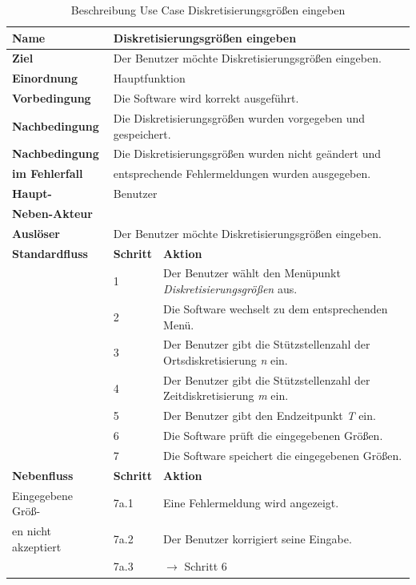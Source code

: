 \begin{table} [H]
	\centering
	\begin{tabular}{|l|l|l|}
		\hline
		\textbf{Name} 			& \multicolumn{2}{|l|}{Diskretisierungsgrößen eingeben}  \\
		\hline
		\textbf{Ziel} 			& \multicolumn{2}{|l|}{Der Benutzer möchte Diskretisierungsgrößen eingeben. }\\ 
		\hline
		\textbf{Einordnung}		& \multicolumn{2}{|l|}{Hauptfunktion}\\
		\hline
		\textbf{Vorbedingung}	& \multicolumn{2}{|l|}{Die Software wird korrekt ausgeführt.} \\
		\hline
		\textbf{Nachbedingung}	& \multicolumn{2}{|l|}{Die Diskretisierungsgrößen wurden vorgegeben und gespeichert.}\\
		\hline
		\textbf{Nachbedingung} 	& \multicolumn{2}{|l|}{Die Diskretisierungsgrößen wurden nicht geändert und}\\
		\textbf{im Fehlerfall}	& \multicolumn{2}{|l|}{entsprechende Fehlermeldungen wurden ausgegeben.}\\
		\hline
		\textbf{Haupt-} 		& \multicolumn{2}{|l|}{Benutzer}\\
		\textbf{Neben-Akteur}	& \multicolumn{2}{|l|}{	}			\\
		\hline
		\textbf{Auslöser} 		& \multicolumn{2}{|l|}{Der Benutzer möchte Diskretisierungsgrößen eingeben.} \\
		\hline 
		\textbf{Standardfluss} & \textbf{Schritt} & \textbf{Aktion} \\
		\hline
		&	1	& Der Benutzer wählt den Menüpunkt \emph{Diskretisierungsgrößen} aus. \\
		\cline{2-3}
		&	2	& Die Software wechselt zu dem entsprechenden Menü.\\
		\cline{2-3}
		&	3	& Der Benutzer gibt die Stützstellenzahl der Ortsdiskretisierung \emph{n} ein.\\
		\cline{2-3}
		&	4	& Der Benutzer gibt die Stützstellenzahl der Zeitdiskretisierung \emph{m} ein.\\
		\cline{2-3}
		&	5	& Der Benutzer gibt den Endzeitpunkt \emph{T} ein.\\
		\cline{2-3}
		&	6	& Die Software prüft die eingegebenen Größen.\\
		\cline{2-3}
		&	7	& Die Software speichert die eingegebenen Größen.\\
		\hline
		\textbf{Nebenfluss} & \textbf{Schritt} & \textbf{Aktion}\\
		\hline
		Eingegebene Größ-  & 7a.1 & Eine Fehlermeldung wird angezeigt.\\
		\cline{2-3}
		en nicht akzeptiert & 7a.2	& Der Benutzer korrigiert seine Eingabe.\\
		\cline{2-3}
					& 7a.3 	& $\rightarrow$ Schritt 6\\
		\hline
	\end{tabular}
	\caption{Beschreibung Use Case Diskretisierungsgrößen eingeben}
	\label{Beschreibung Use Case Diskretisierungsgrössen eingeben}
\end{table}

